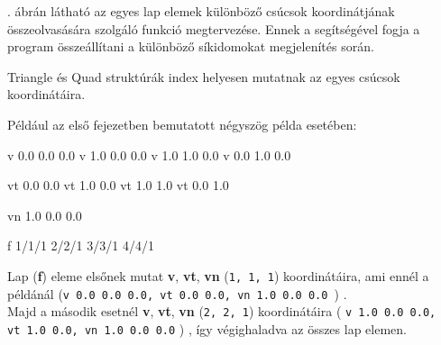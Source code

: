 . ábrán látható az egyes lap elemek különböző csúcsok koordinátjának összeolvasására szolgáló funkció megtervezése. Ennek a segítségével fogja a program összeállítani a különböző síkidomokat megjelenítés során.

Triangle és Quad struktúrák index helyesen mutatnak az egyes csúcsok koordinátáira.

Például az első fejezetben bemutatott négyszög példa esetében:

\begin{python} 
v 0.0 0.0 0.0
v 1.0 0.0 0.0
v 1.0 1.0 0.0
v 0.0 1.0 0.0

vt 0.0 0.0
vt 1.0 0.0
vt 1.0 1.0
vt 0.0 1.0

vn 1.0 0.0 0.0 

f 1/1/1 2/2/1 3/3/1 4/4/1
\end{python}

Lap (\textbf{f}) eleme elsőnek mutat \textbf{v}, \textbf{vt}, \textbf{vn} (\texttt{1, 1, 1}) koordinátáira, ami ennél a példánál (\texttt{v 0.0 0.0 0.0, vt 0.0 0.0, vn 1.0 0.0 0.0 }) . \\

Majd a második esetnél \textbf{v}, \textbf{vt}, \textbf{vn} (\texttt{2, 2, 1}) koordinátáira ( \texttt{v 1.0 0.0 0.0, \\vt 1.0 0.0, vn 1.0 0.0 0.0} ) , így végighaladva az összes lap elemen.


